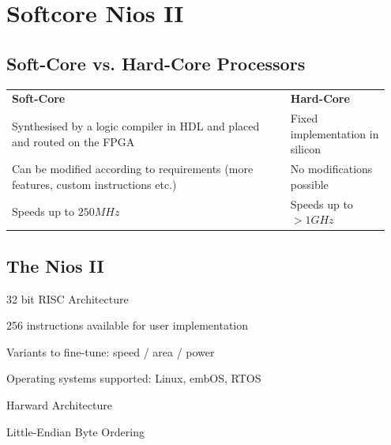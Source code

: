 \section{Softcore Nios II}		
	\subsection{Soft-Core vs. Hard-Core Processors }
		\begin{table}[H]
			\begin{tabular}{|p{0.7\linewidth}|p{0.25\linewidth}|}
				\hline
				\textbf{Soft-Core} 
				& \textbf{Hard-Core}\\
				\hhline{|=|=|}
				Synthesised by a logic compiler in HDL and placed and routed on the FPGA 
				& Fixed implementation in silicon\\
				\hline
				Can be modified according to requirements (more features, custom instructions etc.) 
				& No modifications possible\\
				\hline
				Speeds up to $250MHz$
				& Speeds up to $>1GHz$\\
				\hline			
			\end{tabular}
		\end{table}
	
	\subsection{The Nios II }
		\begin{multicols}{2}
			\begin{compactitem}
				\item 32 bit RISC Architecture
				\item 256 instructions available for user implementation
				\item Variants to fine-tune: speed / area / power
				\item Operating systems supported: Linux, embOS, RTOS
				\item Harward Architecture
				\item Little-Endian Byte Ordering
			\end{compactitem}
		\end{multicols}
	
